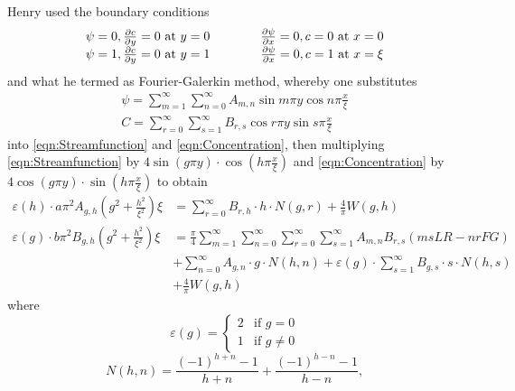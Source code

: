 Henry used the boundary conditions 
\begin{equation} \label{eqn:BC)} \begin{array}{lcr} 
    \psi = 0, \frac{\partial c}{\partial y} =0 \text{ at } y=0
    & \qquad
    & \frac{\partial \psi}{\partial x} = 0, c = 0 \text{ at } x=0 \\
    \psi= 1, \frac{\partial c}{\partial y} = 0 \text{ at } y=1
    & \qquad
    & \frac{\partial \psi}{\partial x} =0,  c=1 \text{ at } x=\xi 
\end{array} \end{equation}
and what he termed as Fourier-Galerkin method, whereby one substitutes
\begin{align}
  \psi = \sum_{m=1}^{\infty}\sum_{n=0}^{\infty} A_{m,n} \sin{m\pi y} \cos{n\pi\frac{x}{\xi}}
    \label{eqn:psi} \\
  C = \sum_{r=0}^{\infty}\sum_{s=1}^{\infty} B_{r,s} \cos{r\pi y} \sin{s\pi\frac{x}{\xi}}
    \label{eqn:C}
\end{align}
into \eqref{eqn:Streamfunction} and \eqref{eqn:Concentration}, then multiplying
\eqref{eqn:Streamfunction} by $4 \sin\left(g \pi y\right) \cdot \cos\left(h \pi \frac{x}{\xi}\right)$ and
\eqref{eqn:Concentration} by $4 \cos\left(g \pi y\right)\cdot \sin\left(h \pi \frac{x}{\xi}\right)$ to obtain
\begin{align}
    \varepsilon(h)\cdot a \pi^{2} A_{g,h} \left(g^{2} + \frac{h^{2} }{\xi ^{2} } \right) \xi 
      &= \sum _{r=0}^{\infty} B_{r,h} \cdot h \cdot N \left(g,r\right) 
      + \frac{4}{\pi} W \left(g, h\right) \label{eqn:A}\\
    \varepsilon(g) \cdot b \pi ^{2} B_{g,h} \left(g^{2} + \frac{h^{2}}{\xi ^{2}}\right) \xi 
      &= \frac{\pi }{4} 
      \sum _{m=1}^{\infty } \sum _{n=0}^{\infty } \sum_{r=0}^{\infty } \sum _{s=1}^{\infty}
      A_{m,n} B_{r,s} (msLR - nrFG) \nonumber \\
      & + \sum_{n=0}^{\infty} A_{g,n} \cdot g \cdot N(h, n) 
      + \varepsilon(g) \cdot \sum_{s=1}^{\infty} B_{g,s} \cdot s\cdot N(h, s) 
      \nonumber \\ 
      &+ \frac{4}{\pi} W(g,h) \label{eqn:B}
\end{align}
where
\begin{equation*}
  \varepsilon(g) = \begin{cases} 2 & \text{if } g=0 \\
    1 & \text{if } g \ne 0
  \end{cases}
\end{equation*}
\begin{equation*}
  N(h,n) = \frac{\left( -1 \right)^{h+n}-1}{h+n} + \frac{\left( -1 \right)^{h-n}-1}{h-n},
\end{equation*}
